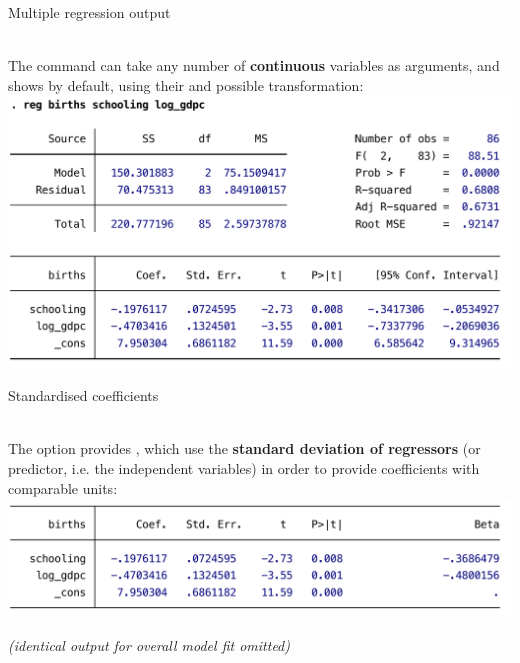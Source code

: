 \documentclass{beamer}
\begin{document}
	\begin{frame}[t]{Multiple regression output}
	
	\\[.5em]

	The  command can take any number of \textbf{continuous} variables as arguments, and shows  by default, using their  and possible transformation:\\[.5em]
		
	\includegraphics[scale=.45]{images/mreg-output.pdf}

	\end{frame}

	\begin{frame}[t]{Standardised coefficients}

	\\[.5em]
	
	The  option provides , which use the \textbf{standard deviation of regressors} (or predictor, i.e. the independent variables) in order to provide coefficients with comparable units:\\[.5em]

	\includegraphics[scale=.45]{images/mreg-output-beta.pdf}
	
	\textit{(identical output for overall model fit omitted)}

	\end{frame}
\end{document}
